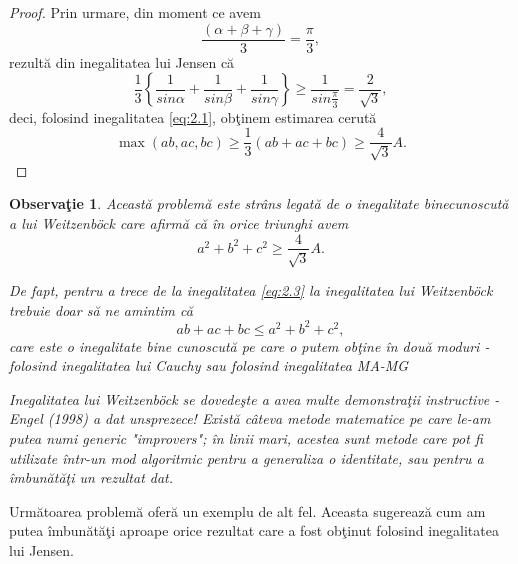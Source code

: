\documentclass[a4paper,12pt,oneside]{report}
\newtheorem{remark}{Observa\c{t}ie}
\begin{document}
\begin{proof}
  Prin urmare, din moment ce avem \[\frac{\left ( \alpha + \beta  + \gamma  \right )}{3}= \frac{\pi }{3},\] rezult\u{a} din inegalitatea lui Jensen c\u{a}
\begin{displaymath}
  \frac{1}{3}\left \{ \frac{1}{sin \alpha }  + \frac{1}{sin \beta } + \frac{1}{sin \gamma }\right \}\geq \frac{1}{sin \frac{\pi }{3}} =  \frac{2}{\sqrt{3}},
\end{displaymath}
deci, folosind inegalitatea \ref{eq:2.1}, ob\c{t}inem estimarea cerut\u{a}
\begin{displaymath}
 \max \left ( ab, ac, bc \right )\geq \frac{1}{3}\left ( ab + ac + bc \right )\geq \frac{4}{\sqrt{3}}A. \label{eq:2.3} \tag{2.3}
\end{displaymath}

\end{proof}
\begin{remark}
Aceast\u{a} problem\u{a} este str\^{a}ns legat\u{a} de o inegalitate binecunoscut\u{a} a lui Weitzenböck care afirm\u{a} c\u{a} \^{i}n orice triunghi avem
\begin{displaymath}
  a^{2} + b^{2} + c^{2} \geq \frac{4}{\sqrt{3}}A. \label{eq:2.4} \tag{2.4}
\end{displaymath}

De fapt, pentru a trece de la inegalitatea \ref{eq:2.3} la inegalitatea lui Weitzenböck trebuie doar s\u{a} ne amintim c\u{a}
\begin{displaymath}
  ab + ac + bc \leq a^{2} + b^{2} + c^{2},
\end{displaymath}
care este o inegalitate bine cunoscut\u{a} pe care o putem ob\c{t}ine \^{i}n dou\u{a} moduri  - folosind inegalitatea lui Cauchy sau folosind inegalitatea MA-MG

  Inegalitatea lui Weitzenböck se dovede\c{s}te a avea multe demonstra\c{t}ii instructive - Engel (1998) a dat unsprezece!
Exist\u{a} c\^{a}teva metode matematice pe care le-am putea numi generic "improvers"; \^{i}n linii mari, acestea sunt metode care pot fi utilizate \^{i}ntr-un mod algoritmic pentru a generaliza o identitate, sau pentru a \^{i}mbun\u{a}t\u{a}\c{t}i un rezultat dat.
\end{remark}
Urm\u{a}toarea problem\u{a} ofer\u{a} un exemplu de alt fel. Aceasta sugereaz\u{a} cum am putea \^{i}mbun\u{a}t\u{a}\c{t}i aproape orice rezultat care a fost ob\c{t}inut folosind inegalitatea lui Jensen.
\end{document}
